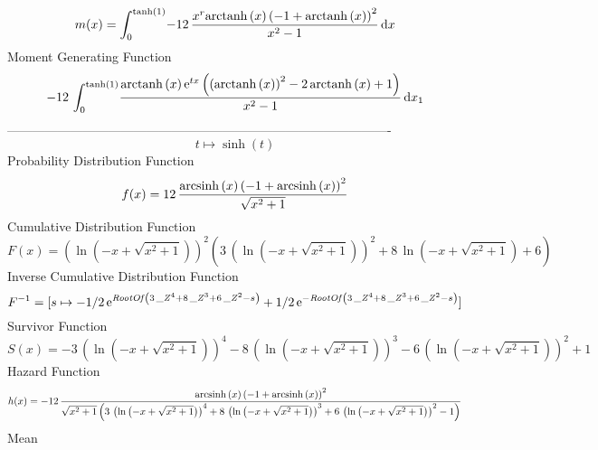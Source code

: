 \documentclass[12pt]{article}
\begin{document}
 $$ m(x) = \int_{0}^{\tanh \left( 1 \right) }\!-12\,{\frac {{x}^{r}{\rm arctanh} 
\left(x\right) \left( -1+{\rm arctanh} \left(x\right) \right) ^{2}}{{x
}^{2}-1}}\,{\rm d}x
$$ Moment Generating Function 
 $$-12\,\int_{0}^{\tanh \left( 1 \right) }\!{\frac {{\rm arctanh} \left(x
\right){{\rm e}^{tx}} \left(  \left( {\rm arctanh} \left(x\right)
 \right) ^{2}-2\,{\rm arctanh} \left(x\right)+1 \right) }{{x}^{2}-1}}
\,{\rm d}x_{{1}}
$$-------------------------------------------------------------------------------------------  \\$$t\mapsto \sinh \left( t \right) 
$$Probability Distribution Function 
$$  f(x)=12\,{\frac {{\rm arcsinh} \left(x\right) \left( -1+{\rm arcsinh} 
\left(x\right) \right) ^{2}}{\sqrt {{x}^{2}+1}}}
$$Cumulative Distribution Function  
 $$F(x)= \left( \ln  \left( -x+\sqrt {{x}^{2}+1} \right)  \right) ^{2} \left( 
3\, \left( \ln  \left( -x+\sqrt {{x}^{2}+1} \right)  \right) ^{2}+8\,
\ln  \left( -x+\sqrt {{x}^{2}+1} \right) +6 \right) 
$$ Inverse Cumulative Distribution Function 
  $$F^{-1} = [s\mapsto -1/2\,{{\rm e}^{{\it RootOf} \left( 3\,{{\it \_Z}}^{4}+8\,{{
\it \_Z}}^{3}+6\,{{\it \_Z}}^{2}-s \right) }}+1/2\,{{\rm e}^{-{\it 
RootOf} \left( 3\,{{\it \_Z}}^{4}+8\,{{\it \_Z}}^{3}+6\,{{\it \_Z}}^{2
}-s \right) }}]
$$Survivor Function 
 $$ S(x)=-3\, \left( \ln  \left( -x+\sqrt {{x}^{2}+1} \right)  \right) ^{4}-8\,
 \left( \ln  \left( -x+\sqrt {{x}^{2}+1} \right)  \right) ^{3}-6\,
 \left( \ln  \left( -x+\sqrt {{x}^{2}+1} \right)  \right) ^{2}+1
$$ Hazard Function 
 $$ h(x)=-12\,{\frac {{\rm arcsinh} \left(x\right) \left( -1+{\rm arcsinh} 
\left(x\right) \right) ^{2}}{\sqrt {{x}^{2}+1} \left( 3\, \left( \ln 
 \left( -x+\sqrt {{x}^{2}+1} \right)  \right) ^{4}+8\, \left( \ln 
 \left( -x+\sqrt {{x}^{2}+1} \right)  \right) ^{3}+6\, \left( \ln 
 \left( -x+\sqrt {{x}^{2}+1} \right)  \right) ^{2}-1 \right) }}
$$Mean 
\end{document}
